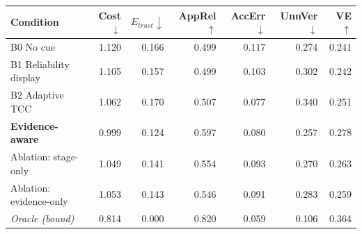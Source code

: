 \begin{tabular}{lrrrrrr}
\toprule
Condition & Cost$\downarrow$ & $E_{trust}\downarrow$ & AppRel$\uparrow$ & AccErr$\downarrow$ & UnnVer$\downarrow$ & VE$\uparrow$ \\
\midrule
B0 No cue & 1.120 & 0.166 & 0.499 & 0.117 & 0.274 & 0.241 \\
B1 Reliability display & 1.105 & 0.157 & 0.499 & 0.103 & 0.302 & 0.242 \\
B2 Adaptive TCC & 1.062 & 0.170 & 0.507 & 0.077 & 0.340 & 0.251 \\
\textbf{Evidence-aware} & 0.999 & 0.124 & 0.597 & 0.080 & 0.257 & 0.278 \\
\midrule
Ablation: stage-only & 1.049 & 0.141 & 0.554 & 0.093 & 0.270 & 0.263 \\
Ablation: evidence-only & 1.053 & 0.143 & 0.546 & 0.091 & 0.283 & 0.259 \\
\midrule
\textit{Oracle (bound)} & 0.814 & 0.000 & 0.820 & 0.059 & 0.106 & 0.364 \\
\bottomrule
\end{tabular}